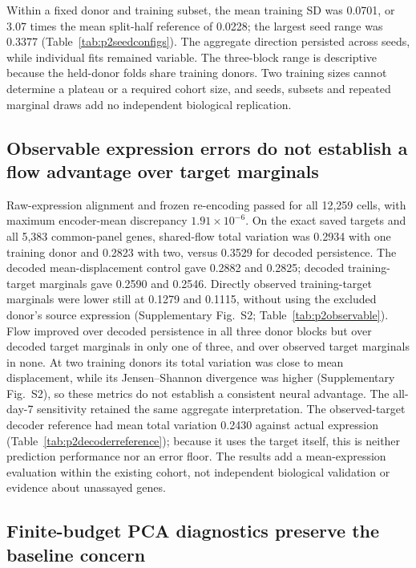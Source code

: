 \documentclass[10pt,a4paper]{article}
\begin{document}
Within a fixed donor and training subset, the mean training SD was 0.0701, or 3.07 times the mean split-half reference of 0.0228; the largest seed range was 0.3377 (Table~\ref{tab:p2seedconfigs}). The aggregate direction persisted across seeds, while individual fits remained variable. The three-block range is descriptive because the held-donor folds share training donors. Two training sizes cannot determine a plateau or a required cohort size, and seeds, subsets and repeated marginal draws add no independent biological replication.

\subsection{Observable expression errors do not establish a flow advantage over target marginals}

Raw-expression alignment and frozen re-encoding passed for all 12,259 cells, with maximum encoder-mean discrepancy $1.91\times10^{-6}$. On the exact saved targets and all 5,383 common-panel genes, shared-flow total variation was 0.2934 with one training donor and 0.2823 with two, versus 0.3529 for decoded persistence. The decoded mean-displacement control gave 0.2882 and 0.2825; decoded training-target marginals gave 0.2590 and 0.2546. Directly observed training-target marginals were lower still at 0.1279 and 0.1115, without using the excluded donor's source expression (Supplementary Fig.~S2; Table~\ref{tab:p2observable}). Flow improved over decoded persistence in all three donor blocks but over decoded target marginals in only one of three, and over observed target marginals in none. At two training donors its total variation was close to mean displacement, while its Jensen--Shannon divergence was higher (Supplementary Fig.~S2), so these metrics do not establish a consistent neural advantage. The all-day-7 sensitivity retained the same aggregate interpretation. The observed-target decoder reference had mean total variation 0.2430 against actual expression (Table~\ref{tab:p2decoderreference}); because it uses the target itself, this is neither prediction performance nor an error floor. The results add a mean-expression evaluation within the existing cohort, not independent biological validation or evidence about unassayed genes.

\subsection{Finite-budget PCA diagnostics preserve the baseline concern}
\end{document}
